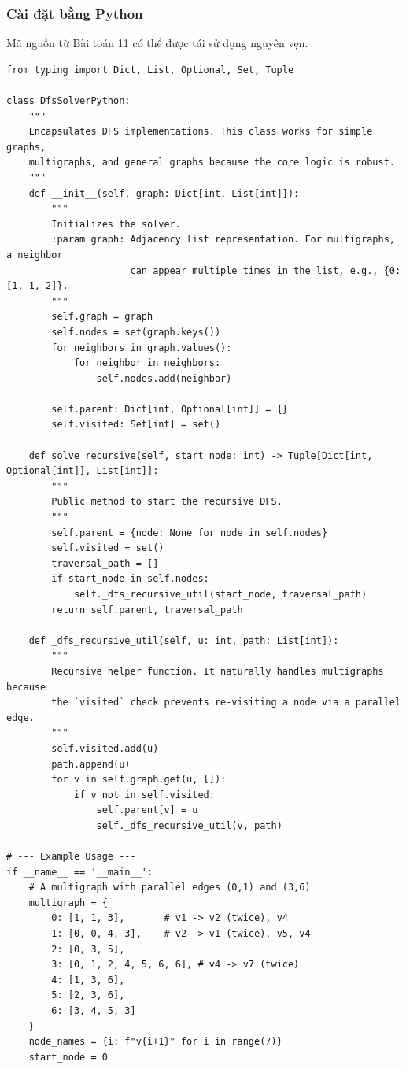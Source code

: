 \documentclass[a4paper,12pt]{article}
\begin{document}
\subsubsection{Cài đặt bằng Python }
Mã nguồn từ Bài toán 11 có thể được tái sử dụng nguyên vẹn.
\begin{lstlisting}[style=pythonstyle, caption={Cài đặt DFS cho đa đồ thị trong Python.}, label={lst:python_dfs_12}]
from typing import Dict, List, Optional, Set, Tuple

class DfsSolverPython:
    """
    Encapsulates DFS implementations. This class works for simple graphs,
    multigraphs, and general graphs because the core logic is robust.
    """
    def __init__(self, graph: Dict[int, List[int]]):
        """
        Initializes the solver.
        :param graph: Adjacency list representation. For multigraphs, a neighbor
                      can appear multiple times in the list, e.g., {0: [1, 1, 2]}.
        """
        self.graph = graph
        self.nodes = set(graph.keys())
        for neighbors in graph.values():
            for neighbor in neighbors:
                self.nodes.add(neighbor)
        
        self.parent: Dict[int, Optional[int]] = {}
        self.visited: Set[int] = set()

    def solve_recursive(self, start_node: int) -> Tuple[Dict[int, Optional[int]], List[int]]:
        """
        Public method to start the recursive DFS.
        """
        self.parent = {node: None for node in self.nodes}
        self.visited = set()
        traversal_path = []
        if start_node in self.nodes:
            self._dfs_recursive_util(start_node, traversal_path)
        return self.parent, traversal_path

    def _dfs_recursive_util(self, u: int, path: List[int]):
        """
        Recursive helper function. It naturally handles multigraphs because
        the `visited` check prevents re-visiting a node via a parallel edge.
        """
        self.visited.add(u)
        path.append(u)
        for v in self.graph.get(u, []):
            if v not in self.visited:
                self.parent[v] = u
                self._dfs_recursive_util(v, path)

# --- Example Usage ---
if __name__ == '__main__':
    # A multigraph with parallel edges (0,1) and (3,6)
    multigraph = {
        0: [1, 1, 3],       # v1 -> v2 (twice), v4
        1: [0, 0, 4, 3],    # v2 -> v1 (twice), v5, v4
        2: [0, 3, 5],
        3: [0, 1, 2, 4, 5, 6, 6], # v4 -> v7 (twice)
        4: [1, 3, 6],
        5: [2, 3, 6],
        6: [3, 4, 5, 3]
    }
    node_names = {i: f"v{i+1}" for i in range(7)}
    start_node = 0


\end{lstlisting}
\end{document}
